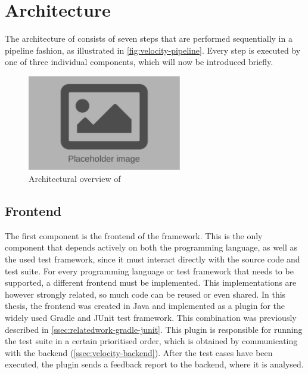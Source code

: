
\section{Architecture}
The architecture of \velocity{} consists of seven steps that are performed sequentially in a pipeline fashion, as illustrated in \autoref{fig:velocity-pipeline}. Every step is executed by one of three individual components, which will now be introduced briefly.

\begin{figure}[htbp!]
	\centering
	\includegraphics[width=0.6\textwidth]{assets/placeholder.pdf}
	\caption{Architectural overview of \velocity{}}
	\label{fig:velocity-pipeline}
\end{figure}

\subsection{Frontend}\label{ssec:velocity-frontend}
The first component is the frontend of the framework. This is the only component that depends actively on both the programming language, as well as the used test framework, since it must interact directly with the source code and test suite. For every programming language or test framework that needs to be supported, a different frontend must be implemented. This implementations are however strongly related, so much code can be reused or even shared. In this thesis, the frontend was created in Java and implemented as a plugin for the widely used Gradle and JUnit test framework. This combination was previously described in \autoref{ssec:relatedwork-gradle-junit}. This plugin is responsible for running the test suite in a certain prioritised order, which is obtained by communicating with the backend (\autoref{ssec:velocity-backend}). After the test cases have been executed, the plugin sends a feedback report to the backend, where it is analysed.

